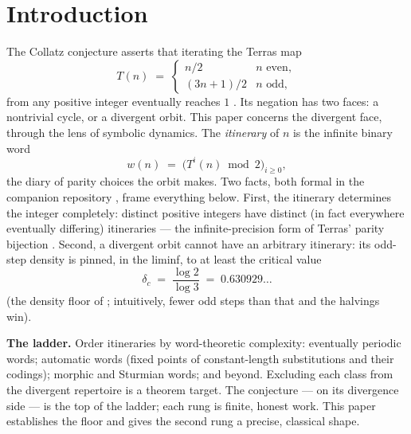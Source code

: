 \documentclass[11pt]{article}
\theoremstyle{definition}
\begin{document}
\section{Introduction}

The Collatz conjecture asserts that iterating the Terras map
\[
T(n) \;=\;
\begin{cases}
n/2 & n \text{ even},\\
(3n+1)/2 & n \text{ odd},
\end{cases}
\]
from any positive integer eventually reaches $1$
\cite{lagarias-overview}. Its negation has two faces: a nontrivial
cycle, or a divergent orbit. This paper concerns the divergent face,
through the lens of symbolic dynamics. The \emph{itinerary} of $n$ is
the infinite binary word
\[
w(n) \;=\; \bigl(T^{i}(n) \bmod 2\bigr)_{i \ge 0},
\]
the diary of parity choices the orbit makes. Two facts, both formal in
the companion repository \cite{companion}, frame everything below.
First, the itinerary determines the integer completely: distinct
positive integers have distinct (in fact everywhere eventually
differing) itineraries --- the infinite-precision form of Terras'
parity bijection \cite{terras}. Second, a divergent orbit cannot have
an arbitrary itinerary: its odd-step density is pinned, in the liminf,
to at least the critical value
\[
\delta_c \;=\; \frac{\log 2}{\log 3} \;=\; 0.630929\ldots
\]
(the density floor of \cite{companion}; intuitively, fewer odd steps
than that and the halvings win).

\textbf{The ladder.} Order itineraries by word-theoretic complexity:
eventually periodic words; automatic words (fixed points of
constant-length substitutions and their codings); morphic and Sturmian
words; and beyond. Excluding each class from the divergent repertoire
is a theorem target. The conjecture --- on its divergence side --- is
the top of the ladder; each rung is finite, honest work. This paper
establishes the floor and gives the second rung a precise,
classical shape.
\end{document}
